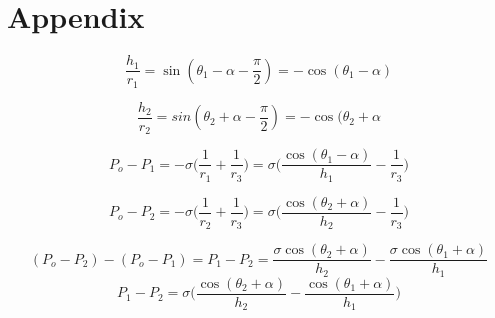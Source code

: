 \documentclass{article}
\begin{document}
\section*{Appendix}
 

\begin{equation}
\frac{h_1}{r_1} = \sin(\theta_1 - \alpha - \frac{\pi}{2}) = - \cos(\theta_1 - \alpha)
\end{equation}

\begin{equation}
\frac{h_2}{r_2} = sin(\theta_2 + \alpha - \frac{\pi}{2}) = -\cos(\theta_2 + \alpha
\end{equation}

\begin{equation}
P_o - P_1 = -\sigma \Big( \frac{1}{r_1} + \frac{1}{r_3} \Big) = \sigma \Big( \frac{\cos(\theta_1 - \alpha)}{h_1} - \frac{1}{r_3} \Big)
\end{equation} 

\begin{equation}
P_o - P_2 = -\sigma \Big( \frac{1}{r_2} + \frac{1}{r_3} \Big) = \sigma \Big( \frac{\cos(\theta_2 + \alpha)}{h_2} - \frac{1}{r_3} \Big)
\end{equation}

\begin{equation}
(P_o - P_2) - (P_o - P_1) = P_1 - P_2 = \frac{\sigma \cos(\theta_2 + \alpha)}{h_2} - \frac{\sigma \cos(\theta_1 + \alpha)}{h_1}
\end{equation}
\begin{equation}
P_1 - P_2 = \sigma \Big(  \frac{\cos(\theta_2 + \alpha)}{h_2} -\frac{\cos(\theta_1 + \alpha)}{h_1} \Big)
\end{equation}

\pagebreak

 

\end{document}
